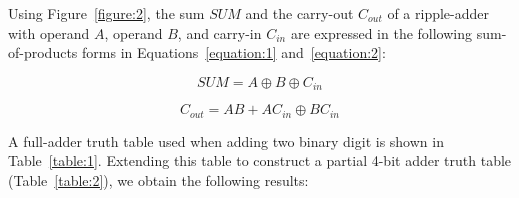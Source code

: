 \documentclass[12pt]{article}
\begin{document}
\newpage

Using Figure~\ref{figure:2}, the sum $SUM$ and the carry-out $C_{out}$ of a ripple-adder with operand $A$, operand $B$, and carry-in $C_{in}$ are expressed in the following sum-of-products forms in Equations~\ref{equation:1} and~\ref{equation:2}:

\begin{equation} \label{equation:1}
    SUM = A \oplus B \oplus C_{in}
\end{equation}

\begin{equation} \label{equation:2}
    C_{out} = AB + AC_{in} \oplus BC_{in}
\end{equation}

A full-adder truth table used when adding two binary digit is shown in Table~\ref{table:1}. Extending this table to construct a partial 4-bit adder truth table (Table~\ref{table:2}), we obtain the following results:
\end{document}
